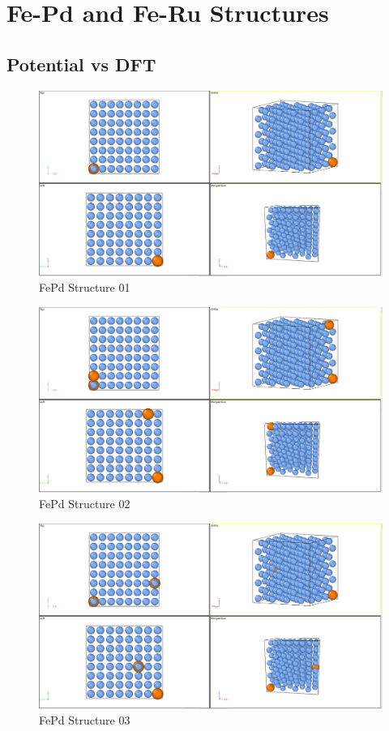 \chapter{Fe-Pd and Fe-Ru Structures}
\label{chapter:appendix-fepd-feru-structures}


\section{Potential vs DFT}

\begin{figure}[htb]
\centering
\includegraphics[width=.85\linewidth]{appendix/fepd_feru_configurations/fepd/fepd256_01r.png}  
\caption{FePd Structure 01}
\label{fig:fepd01}
\end{figure}

\begin{figure}[htb]
\centering
\includegraphics[width=.85\linewidth]{appendix/fepd_feru_configurations/fepd/fepd256_02r.png}  
\caption{FePd Structure 02}
\label{fig:fepd02}
\end{figure}

\begin{figure}[htb]
\centering
\includegraphics[width=.85\linewidth]{appendix/fepd_feru_configurations/fepd/fepd256_03r.png}   
\caption{FePd Structure 03}
\label{fig:fepd03}
\end{figure}

